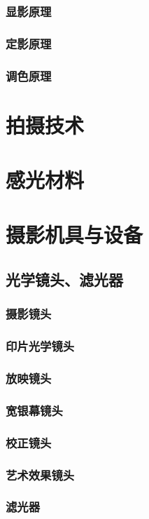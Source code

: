 \documentclass[UTF8]{../../ApplicationUniverse}
\begin{document}
        \subsubsection{显影原理}
        \subsubsection{定影原理}
        \subsubsection{调色原理}
\section{拍摄技术}
\section{感光材料}
\section{摄影机具与设备}
    \subsection{光学镜头、滤光器}
        \subsubsection{摄影镜头}
        \subsubsection{印片光学镜头}
        \subsubsection{放映镜头}
        \subsubsection{宽银幕镜头}
        \subsubsection{校正镜头}
        \subsubsection{艺术效果镜头}
        \subsubsection{滤光器}
\end{document}

